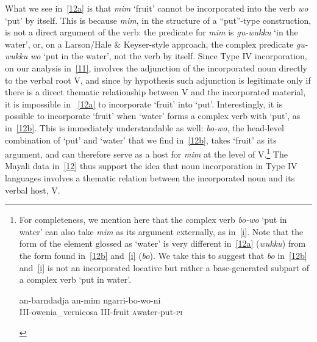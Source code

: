 \documentclass[output=paper]{langsci/langscibook}
\begin{document}
\begin{refcontext}
\ea \label{12}
    \z
\z
What we see in~\eqref{12a} is that \emph{mim} \enquote*{fruit} cannot be incorporated into the
verb \emph{wo} \enquote*{put} by itself. This is because \emph{mim}, in the structure
of a \enquote{put}-type construction, is not a direct argument of the verb: the
predicate for \emph{mim} is \emph{gu-wukku} \enquote*{in the water}, or, on a
Larson/Hale \&{} Keyser-style approach, the complex predicate \emph{gu-wukku}
\emph{wo} \enquote*{put in the water}, not the verb by itself. Since Type IV
incorporation, on our analysis in~\eqref{11}, involves the adjunction of the
incorporated noun directly to the verbal root V, and since by hypothesis such
adjunction is legitimate only if there is a direct thematic relationship
between V and the incorporated material, it is impossible in ~\eqref{12a}
to incorporate \enquote*{fruit} into \enquote*{put}. Interestingly, it is possible to
incorporate \enquote*{fruit} when \enquote*{water} forms a complex verb with \enquote*{put}, as
in~\eqref{12b}. This is immediately understandable as well: \emph{bo-wo}, the
head-level combination of \enquote*{put} and \enquote*{water} that we find in~\eqref{12b},
takes \enquote*{fruit} as its argument, and can therefore serve as a host for
\emph{mim} at
the level of V.\footnote{For completeness, we mention here that the complex
    verb \emph{bo-wo} \enquote*{put in water} can also take \emph{mim} as its
    argument externally, as in~\eqref{i}. Note that the form of the element
    glossed as \enquote*{water} is very different in~\eqref{12a} (\emph{wukku}) from
    the form found in~\eqref{12b} and~\eqref{i} (\emph{bo}). We take this to
    suggest that \emph{bo} in~\eqref{12b} and~\eqref{i} is not an incorporated
    locative but rather a base-generated subpart of a complex verb \enquote*{put in
    water}.

\begin{exe}
     
    \sn
    \gll an-barndadja an-mim ngarri-bo-wo-ni\label{i}\\
    III-owenia\_vernicosa III-fruit \First\textsc{a}\normalfont{-}water-put-\textsc{pi}\\
\end{exe}} The Mayali data in~\eqref{12} thus support the idea that noun
incorporation in Type IV languages involves a thematic relation between the
incorporated noun and its verbal host, V.


\end{refcontext}
\end{document}
